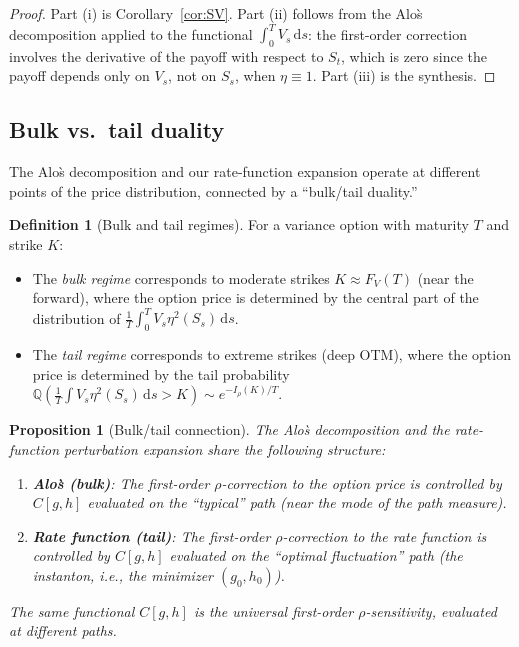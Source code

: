 \documentclass[11pt]{article}
\newtheorem{proposition}[theorem]{Proposition}
\theoremstyle{definition}
\newtheorem{definition}[theorem]{Definition}
\newcommand{\dd}{\mathrm{d}}
\newcommand{\Q}{\mathbb{Q}}
\begin{document}
\begin{proof}
Part (i) is Corollary~\ref{cor:SV}. Part (ii) follows from the Alo\`s decomposition applied to the functional $\int_0^T V_s\,\dd s$: the first-order correction involves the derivative of the payoff with respect to $S_t$, which is zero since the payoff depends only on $V_s$, not on $S_s$, when $\eta \equiv 1$. Part (iii) is the synthesis.
\end{proof}

\subsection{Bulk vs.\ tail duality}\label{sec:bulk_tail}

The Alo\`s decomposition and our rate-function expansion operate at different points of the price distribution, connected by a ``bulk/tail duality.''

\begin{definition}[Bulk and tail regimes]\label{def:regimes}
For a variance option with maturity $T$ and strike $K$:
\begin{itemize}
  \item The \emph{bulk regime} corresponds to moderate strikes $K \approx F_V(T)$ (near the forward), where the option price is determined by the central part of the distribution of $\frac{1}{T}\int_0^T V_s\eta^2(S_s)\,\dd s$.
  \item The \emph{tail regime} corresponds to extreme strikes (deep OTM), where the option price is determined by the tail probability $\Q(\frac{1}{T}\int V_s\eta^2(S_s)\,\dd s > K) \sim e^{-I_\rho(K)/T}$.
\end{itemize}
\end{definition}

\begin{proposition}[Bulk/tail connection]\label{prop:bulk_tail}
The Alo\`s decomposition and the rate-function perturbation expansion share the following structure:
\begin{enumerate}[label=(\roman*)]
  \item \textbf{Alo\`s (bulk)}: The first-order $\rho$-correction to the option price is controlled by $C[g,h]$ evaluated on the ``typical'' path (near the mode of the path measure).
  \item \textbf{Rate function (tail)}: The first-order $\rho$-correction to the rate function is controlled by $C[g,h]$ evaluated on the ``optimal fluctuation'' path (the instanton, i.e., the minimizer $(g_0, h_0)$).
\end{enumerate}
The same functional $C[g,h]$ is the universal first-order $\rho$-sensitivity, evaluated at different paths.
\end{proposition}
\end{document}
